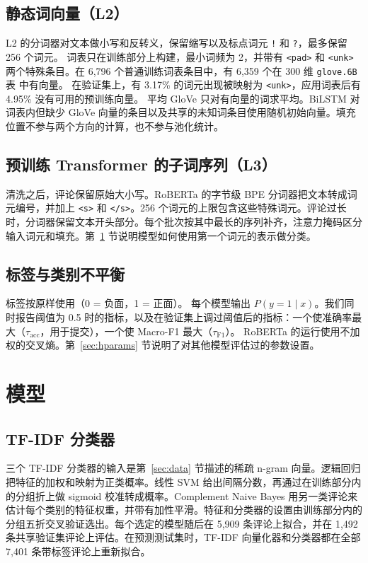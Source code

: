 \documentclass[11pt,a4paper]{article}
\begin{document}
\subsection{静态词向量（L2）}
L2 的分词器对文本做小写和反转义，保留缩写以及标点词元 \texttt{!} 和 \texttt{?}，最多保留 256 个词元。
词表只在训练部分上构建，最小词频为 2，并带有 \texttt{<pad>} 和 \texttt{<unk>} 两个特殊条目。在 6{,}796 个普通训练词表条目中，有 6{,}359 个在 300 维 \texttt{glove.6B} 表\cite{pennington2014glove} 中有向量。
在验证集上，有 3.17\% 的词元出现被映射为 \texttt{<unk>}，应用词表后有 4.95\% 没有可用的预训练向量。
平均 GloVe 只对有向量的词求平均。BiLSTM 对词表内但缺少 GloVe 向量的条目以及共享的未知词条目使用随机初始向量。填充位置不参与两个方向的计算，也不参与池化统计。

\subsection{预训练 Transformer 的子词序列（L3）}
清洗之后，评论保留原始大小写。RoBERTa 的字节级 BPE 分词器把文本转成词元编号，并加上 \texttt{<s>} 和 \texttt{</s>}。256 个词元的上限包含这些特殊词元。评论过长时，分词器保留文本开头部分。每个批次按其中最长的序列补齐，注意力掩码区分输入词元和填充。第~\ref{sec:models} 节说明模型如何使用第一个词元的表示做分类。

\subsection{标签与类别不平衡}
标签按原样使用（0 = 负面，1 = 正面）。
每个模型输出 $P(y{=}1\mid x)$。我们同时报告阈值为 0.5 时的指标，以及在验证集上调过阈值后的指标：一个使准确率最大（$\tau_{\mathrm{acc}}$，用于提交），一个使 Macro-F1 最大（$\tau_{\mathrm{F1}}$）。
RoBERTa 的运行使用不加权的交叉熵。第~\ref{sec:hparams} 节说明了对其他模型评估过的参数设置。

\section{模型}\label{sec:models}

\subsection{TF-IDF 分类器}
三个 TF-IDF 分类器的输入是第~\ref{sec:data} 节描述的稀疏 n-gram 向量。逻辑回归把特征的加权和映射为正类概率。线性 SVM 给出间隔分数，再通过在训练部分内的分组折上做 sigmoid 校准转成概率。Complement Naive Bayes 用另一类评论来估计每个类别的特征权重，并带有加性平滑。特征和分类器的设置由训练部分内的分组五折交叉验证选出。每个选定的模型随后在 5{,}909 条评论上拟合，并在 1{,}492 条共享验证集评论上评估。在预测测试集时，TF-IDF 向量化器和分类器都在全部 7{,}401 条带标签评论上重新拟合。
\end{document}
